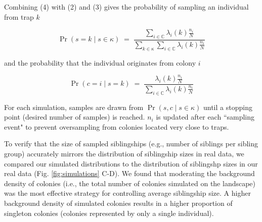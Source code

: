 \documentclass[12pt]{article}
\begin{document}
Combining (4) with (2) and (3) gives the probability of sampling an individual from trap $k$


\[
\Pr(s = k \mid s \in \kappa) \;=\; \frac{\sum_{i \in \mathbb{C}} \lambda_i(k) \frac{n_i}{N}}{\sum_{k \in \kappa} \sum_{i \in \mathbb{C}} \lambda_i(k) \frac{n_i}{N}}
\]

and the probability that the individual originates from colony $i$


\[
\Pr(c = i \mid s = k) \;=\; \frac{\lambda_i(k) \frac{n_i}{N}}{\sum_{i \in \mathbb{C}} \lambda_i(k) \frac{n_i}{N}}
\]

For each simulation, samples are drawn from $\Pr(s, c \mid s \in \kappa)$ until a stopping point (desired number of samples) is reached. $n_i$ is updated after each ``sampling event" to prevent oversampling from colonies located very close to traps.

To verify that the size of sampled siblingships (e.g., number of siblings per sibling group) accurately mirrors the distribution of siblingship sizes in real data, we compared our simulated distributions to the distribution of siblingshp sizes in our real data (Fig. \ref{fig:simulations} C-D).
We found that moderating the background density of colonies (i.e., the total number of colonies simulated on the landscape) was the most effective strategy for controlling average siblingship size. A higher background density of simulated colonies results in a higher proportion of singleton colonies (colonies represented by only a single individual).
\end{document}

